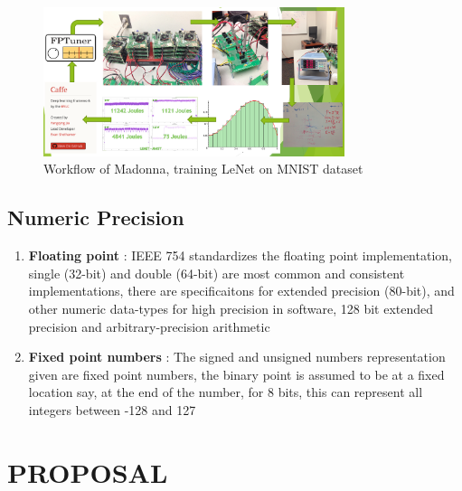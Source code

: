 \documentclass[letterpaper, 10 pt, conference]{ieeeconf}
\begin{document}
          \begin{figure}[h]
              \centering 
              \includegraphics[width=88mm,scale=1.1]{wf}
              \caption{Workflow of Madonna, training LeNet on MNIST dataset}
              \label{q1}
          \end{figure}

\subsection{Numeric Precision}

\begin{enumerate}
  \item \textbf{Floating point} : IEEE 754 standardizes the floating point
        implementation, single (32-bit) and double (64-bit) are 
        most common and consistent implementations, there are specificaitons
        for extended precision (80-bit), and other numeric data-types
        for high precision in software, 128 bit extended precision
        and arbitrary-precision arithmetic
  \item \textbf{Fixed point numbers} : The signed and unsigned numbers
        representation given are fixed point numbers, the binary point
        is assumed to be at a fixed location say, at the end of the number, 
        for 8 bits, this can represent all integers between -128 and 127
\end{enumerate}


\section{PROPOSAL}
         
\end{document}
